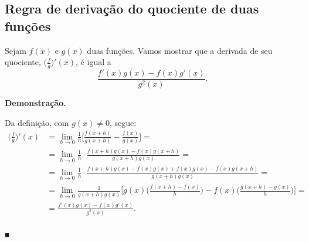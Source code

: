 \documentclass{article}
\begin{document}
{\begin{newpage}
\subsection{Regra de derivação do quociente de duas funções}
\hspace{12pt}Sejam $f(x)$ e $g(x)$ duas funções. Vamos mostrar que a derivada de seu quociente, $\Big(\displaystyle{\frac{f}{g}}\Big)'(x)$, é igual a $$\displaystyle{\frac{f'(x)g(x) - f(x)g'(x)}{g^2(x)}}.$$
\vspace{0.3cm}
\par
\textbf{Demonstração.}
\par
Da definição, com $g(x)\neq 0$, segue:
\vspace{0.3cm}
\begin{equation*} \begin{split} \Big(\displaystyle{\frac{f}{g}}\Big)'(x) &= \displaystyle{\lim_{h\to 0} \frac{1}{h}\Big[\displaystyle{\frac{f(x+h)}{g(x+h)} - \frac{f(x)}{g(x)}}\Big]} = \\ &= \displaystyle{\lim_{h\to 0} \frac{1}{h}\cdot\displaystyle{\frac{f(x+h)g(x) - f(x)g(x+h)}{g(x+h)g(x)}}} =\\ &=
\displaystyle{\lim_{h\to 0} \frac{1}{h}\cdot\displaystyle{\frac{f(x+h)g(x) - f(x)g(x) + f(x)g(x) - f(x)g(x+h)}{g(x+h)g(x)}}} =\\ & = \displaystyle{\lim_{h\to 0} \frac{1}{g(x+h)g(x)}\Big[\displaystyle{g(x)\Big(\frac{f(x+h) - f(x)}{h}\Big) - f(x)\Big(\frac{g(x+h) - g(x)}{h}\Big)}\Big]} = \\ &= \displaystyle{\frac{f'(x)g(x) - f(x)g'(x)}{g^2(x)}} .\end{split} \end{equation*}\begin{flushright} $_{\blacksquare }$ \end{flushright}
\vspace{0.3cm}

\end{newpage}}
\end{document}
